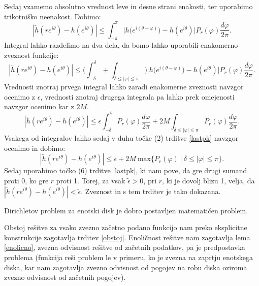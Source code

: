 \documentclass[mat1]{fmfdelo}
\begin{document}
\begin{dokaz}
$$        $$
        Sedaj vzamemo absolutno vrednost leve in desne strani enakosti, ter uporabimo trikotniško neenakost. Dobimo:
        $$
        |\widetilde{h}(re^{i\theta}) - h(e^{i\theta})| \leq \int_{-\pi}^{\pi}{\bigg| h\big(e^{i(\theta - \varphi)}\big) - h(e^{i\theta})\bigg|P_r(\varphi)\frac{d\varphi}{2\pi}}.
        $$
        Integral lahko razdelimo na dva dela, da bomo lahko uporabili enakomerno zveznost funkcije:
        $$
        |\widetilde{h}(re^{i\theta}) - h(e^{i\theta})| \leq \bigg(\int_{-\delta}^{\delta} + \int_{\delta \leq |\varphi| \le \pi}\bigg){\bigg| h\big(e^{i(\theta - \varphi)}\big) - h(e^{i\theta})\bigg|P_r(\varphi)\frac{d\varphi}{2\pi}}.
        $$
        Vrednosti znotraj prvega integral lahko zaradi enakomerne zveznosti navzgor ocenimo z $\epsilon$, vrednosti znotraj drugega integrala pa lahko prek omejenosti navzgor ocenimo kar z $2M$. 
        $$
        |\widetilde{h}(re^{i\theta}) - h(e^{i\theta})| \leq \epsilon \int_{-\delta}^{\delta}{P_r(\varphi) \frac{d\varphi}{2\pi}} + 2M\int_{\delta \leq |\varphi| \leq \pi}{P_r(\varphi)\frac{d\varphi}{2\pi}}.
        $$
        Vsakega od integralov lahko sedaj v duhu točke (2) trditve \ref{lastpk} navzgor ocenimo in dobimo:
        $$
        |\widetilde{h}(re^{i\theta}) - h(e^{i\theta})| \leq \epsilon  + 2M~\text{max}\{P_r(\varphi)~| ~\delta \leq |\varphi| \leq \pi \}.
        $$
        Sedaj uporabimo točko (6) trditve \ref{lastpk}, ki nam pove, da gre drugi sumand proti 0, ko gre $r$ proti 1. 
        Torej, za vsak $\widetilde{\epsilon} > 0$, pri $r$, ki je dovolj blizu 1, velja, da $|\widetilde{h}(re^{i\theta}) - h(e^{i\theta})| < \widetilde{\epsilon}$.
        Zveznost in s tem trditev je tako dokazana.
    \end{dokaz}
    \begin{posledica}
        Dirichletov problem za enotski disk je dobro postavljen matematičen problem. 
    \end{posledica}
    \begin{dokaz}
        Obstoj rešitve za vsako zvezno začetno podano funkcijo nam preko eksplicitne konstrukcije zagotavlja trditev \ref{obstoj}. 
        Enoličnost rešitve nam zagotavlja lema \ref{enolicno}, zvezna odvisnost rešitve od začetnih podatkov, pa je predpostavka problema (funkcija reši problem le v primeru, ko je zvezna na zaprtju enotskega diska, kar nam zagotavlja zvezno odvisnost od pogojev na robu diska oziroma zvezno odvisnost od začetnih pogojev).
    \end{dokaz}
\end{document}
